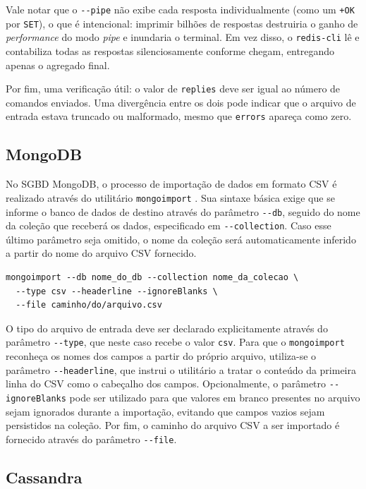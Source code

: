 Vale notar que o \texttt{-{}-pipe} não exibe cada resposta individualmente (como um
\texttt{+OK} por \texttt{SET}), o que é intencional: imprimir bilhões de respostas
destruiria o ganho de \textit{performance} do modo \textit{pipe} e inundaria o terminal.
Em vez disso, o \texttt{redis-cli} lê e contabiliza todas as respostas silenciosamente
conforme chegam, entregando apenas o agregado final.

Por fim, uma verificação útil: o valor de \texttt{replies} deve ser igual ao número de
comandos enviados. Uma divergência entre os dois pode indicar que o arquivo de entrada
estava truncado ou malformado, mesmo que \texttt{errors} apareça como zero.

\subsection{MongoDB}

No SGBD MongoDB, o processo de importação de dados em formato CSV é realizado através do
utilitário \texttt{mongoimport} \cite{mongodb_mongoimport}. Sua sintaxe básica exige que se informe o banco de dados
de destino através do parâmetro \texttt{-{}-db}, seguido do nome da coleção que receberá
os dados, especificado em \texttt{-{}-collection}. Caso esse último parâmetro seja omitido,
o nome da coleção será automaticamente inferido a partir do nome do arquivo CSV fornecido.

\begin{lstlisting}[style=bashstyle]
mongoimport --db nome_do_db --collection nome_da_colecao \
  --type csv --headerline --ignoreBlanks \
  --file caminho/do/arquivo.csv
\end{lstlisting}

O tipo do arquivo de entrada deve ser declarado explicitamente através do parâmetro
\texttt{-{}-type}, que neste caso recebe o valor \texttt{csv}. Para que o
\texttt{mongoimport} reconheça os nomes dos campos a partir do próprio arquivo, utiliza-se
o parâmetro \texttt{-{}-headerline}, que instrui o utilitário a tratar o conteúdo da
primeira linha do CSV como o cabeçalho dos campos. Opcionalmente, o parâmetro
\texttt{-{}-ignoreBlanks} pode ser utilizado para que valores em branco presentes no
arquivo sejam ignorados durante a importação, evitando que campos vazios sejam persistidos
na coleção. Por fim, o caminho do arquivo CSV a ser importado é fornecido através do
parâmetro \texttt{-{}-file}.

\subsection{Cassandra}

